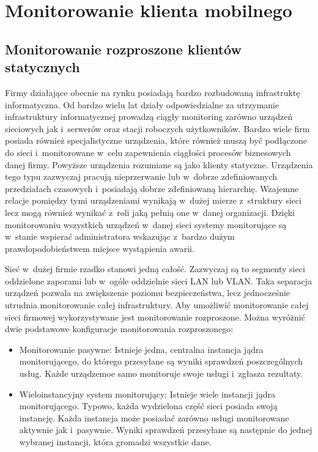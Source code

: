 \chapter{Monitorowanie klienta mobilnego}
\label{chap:Wymagania}

\section[Monitorowanie rozproszone][Monitorowanie rozproszone klientów
statycznych]{Monitorowanie rozproszone klientów statycznych}

Firmy działające obecnie na rynku posiadają bardzo rozbudowaną
infrastruktę informatyczna. Od bardzo wielu lat działy odpowiedzialne
za utrzymanie infrastruktury informatycznej prowadzą ciągły monitoring
zarówno urządzeń sieciowych jak i~serwerów oraz stacji roboczych
użytkowników. Bardzo wiele firm posiada również specjalistyczne
urządzenia, które również muszą być podłączone do sieci i~monitorowane
w~celu zapewnienia ciągłości procesów biznesowych danej
firmy. Powyższe urządzenia rozumiane są jako klienty
statyczne. Urządzenia tego typu zazwyczaj pracują nieprzerwanie lub
w~dobrze zdefiniowanych przedziałach czasowych i~posiadają dobrze
zdefiniowaną hierarchię. Wzajemne relacje pomiędzy tymi urządzeniami
wynikają w~dużej mierze z~struktury sieci lecz mogą również wynikać
z~roli jaką pełnią one w~danej organizacji. Dzięki monitorowaniu
wszystkich urządzeń w~danej sieci systemy monitorujące są w~stanie
wspierać administratora wskazując z~bardzo dużym prawdopodobieństwem
miejsce wystąpienia awarii.

Sieć w~dużej firmie rzadko stanowi jedną całość. Zazwyczaj są to
segmenty sieci oddzielone zaporami lub w~ogóle oddzielnie sieci LAN
lub VLAN. Taka separacja urządzeń pozwala na zwiększenie poziomu
bezpieczeństwa, lecz jednocześnie utrudnia monitorowanie całej
infrastruktury. Aby umożliwić monitorowanie całej sieci firmowej
wykorzystywane jest monitorowanie rozproszone. Można wyróżnić dwie
podstawowe konfiguracje monitorowania rozproszonego:

\begin{itemize}
\item Monitorowanie pasywne: Istnieje jedna, centralna instancja jądra
  monitorującego, do którego przesyłane są wyniki sprawdzeń
  poszczególnych usług. Każde urządzemoe samo monitoruje swoje usługi
  i~zgłasza rezultaty.
\item Wieloinstancyjny system monitorujący: Istnieje wiele instancji
  jądra monitorującego. Typowo, każda wydzielona część sieci posiada
  swoją instancję. Każda instancja może posiadać zarówno usługi
  monitorowane aktywnie jak i~pasywnie. Wyniki sprawdzeń przesyłane są
  następnie do jednej wybranej instancji, która gromadzi wszystkie
  dane.
\end{itemize}

